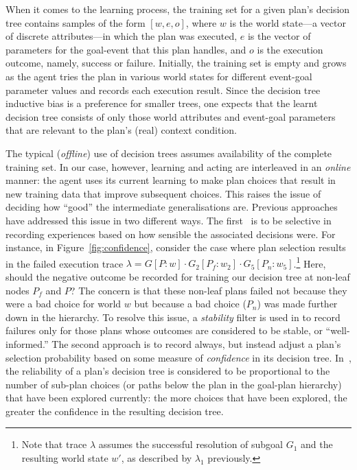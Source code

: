 When it comes to the learning process, the training set for a given plan's decision tree contains samples of the form $[w, e, o]$, where $w$ is the world state---a vector of discrete attributes---in which the plan was executed, $e$ is the vector of parameters for the goal-event that this plan handles, and $o$ is the execution outcome, namely, success or failure. Initially, the training set is empty and grows as the agent tries the plan in various world states for different event-goal parameter values and records each execution result. 
Since the decision tree inductive bias is a preference for smaller trees, one expects that the learnt decision tree consists of only those world attributes and event-goal parameters that are relevant to the plan's (real) context condition.

The typical ({\em offline}) use of decision trees assumes availability of the complete training set. In our case, however, learning and acting are interleaved in an {\em online} manner: the agent uses its current learning to make plan choices that result in new training data that improve subsequent choices. This raises the issue of deciding how ``good'' the intermediate generalisations are. Previous approaches have addressed this issue in two different ways. The first~\cite{airiau09:enhancing} is to be selective in recording experiences based on how sensible the associated decisions were. For instance, in Figure~\ref{fig:confidence}, consider the case where plan selection results in the failed execution trace $\lambda = G[P:w] \cdot G_2[P_f:w_2] \cdot G_5[P_n:w_5]$.\footnote{Note that trace $\lambda$ assumes the successful resolution of subgoal $G_1$ and the resulting world state $w'$, as described by $\lambda_1$ previously.} Here, should the negative outcome be recorded for training our decision tree at non-leaf nodes $P_f$ and $P$? The concern is that these non-leaf plans failed not because they were a bad choice for world $w$ but because a bad choice ($P_n$) was made further down in the hierarchy. To resolve this issue, a {\em stability} filter is used in \cite{airiau09:enhancing} to record failures only for those plans whose outcomes are considered to be stable, or ``well-informed.'' The second approach is to record always, but instead adjust a plan's selection probability based on some measure of {\em confidence} in its decision tree. In~\cite{singh10:extending,singh10:learning}, the reliability of a plan's decision tree is considered to be proportional to the number of sub-plan choices (or paths below the plan in the goal-plan hierarchy) that have been explored currently: the more choices that have been explored, the greater the confidence in the resulting decision tree. 

